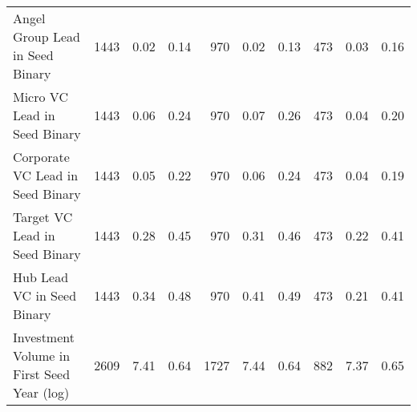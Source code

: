 {\begin{table}[!h]
{\begin{tabular}[t]{lrrrrrrrrr}
Angel Group Lead in Seed Binary & 1443 & 0.02 & 0.14 & 970 & 0.02 & 0.13 & 473 & 0.03 & 0.16\\
Micro VC Lead in Seed Binary & 1443 & 0.06 & 0.24 & 970 & 0.07 & 0.26 & 473 & 0.04 & 0.20\\
Corporate VC Lead in Seed Binary & 1443 & 0.05 & 0.22 & 970 & 0.06 & 0.24 & 473 & 0.04 & 0.19\\
Target VC Lead in Seed Binary & 1443 & 0.28 & 0.45 & 970 & 0.31 & 0.46 & 473 & 0.22 & 0.41\\
\addlinespace
Hub Lead VC in Seed Binary & 1443 & 0.34 & 0.48 & 970 & 0.41 & 0.49 & 473 & 0.21 & 0.41\\
Investment Volume in First Seed Year (log) & 2609 & 7.41 & 0.64 & 1727 & 7.44 & 0.64 & 882 & 7.37 & 0.65\\
\bottomrule
\end{tabular}}
\end{table}
}
